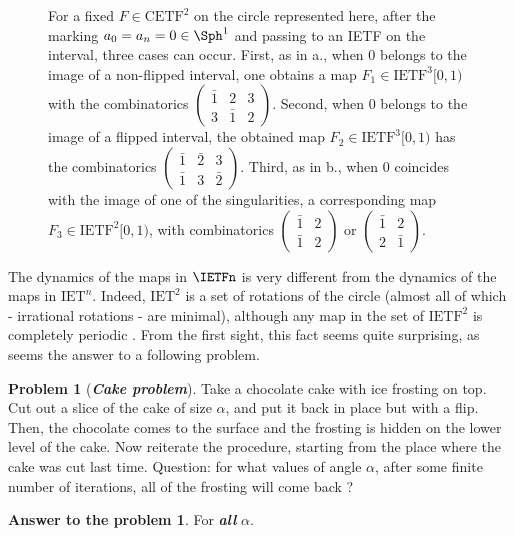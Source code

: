 \documentclass[12pt]{article}
\theoremstyle{definition}
\newtheorem*{problem}{Problem}
\newtheorem*{answer}{Answer to the problem}
\begin{document}
\begin{figure}
\caption[]{For a fixed $F\in \mathrm{CETF}^2$ on the circle represented here, after the marking $a_0=a_n=0 \in \Sph^1$ and passing to an IETF on the interval, three cases can occur. First, as in a., when $0$ belongs to the image of a non-flipped interval, one obtains a map $F_1 \in \mathrm{IETF}^3 [0,1)$ with the combinatorics
$\begin{pmatrix} \bar{1} & 2 & 3\\
3 & \bar{1} & 2
\end{pmatrix}$. Second, when $0$ belongs to the image of a flipped interval, the obtained map  $F_2 \in \mathrm{IETF}^3 [0,1)$ has the combinatorics
$\begin{pmatrix} \bar{1} & \bar{2} & 3\\
\bar{1} & 3 & \bar{2}
\end{pmatrix}$. Third, as in b., when $0$ coincides with the image of one of the singularities, a corresponding map $F_3 \in \mathrm{IETF}^2 [0,1)$, with combinatorics $\begin{pmatrix} \bar{1} & 2 \\
\bar{1} & 2
\end{pmatrix}$ or $\begin{pmatrix} \bar{1} & 2 \\
2 & \bar{1}
\end{pmatrix}$.
} \label{fig:defdif}
\end{figure}

The dynamics of the maps in $\IETFn$ is very different from the dynamics of the maps in $\mathrm{IET}^n$. Indeed, $\mathrm{IET}^2$ is a set of rotations of the circle (almost all of which - irrational rotations - are minimal), although any map in the set of $\mathrm{IETF}^2$ is completely periodic \cite{K75}. From the first sight, this fact seems quite surprising, as seems the answer to a following problem.

\begin{problem}[\emph{\textbf{Cake problem}}]
Take a chocolate cake with ice frosting on top. Cut out a slice of the cake of size $\alpha$, and put it back in place but with a flip. Then, the chocolate comes to the surface and the frosting is hidden on the lower level of the cake. Now reiterate the procedure, starting from the place where the cake was cut last time.
Question: for what values of angle $\alpha$, after some finite number of iterations, all of the frosting will come back ? 
\end{problem}

\begin{answer}
For \emph{\textbf{all}} $\alpha$.
\end{answer}
\end{document}
